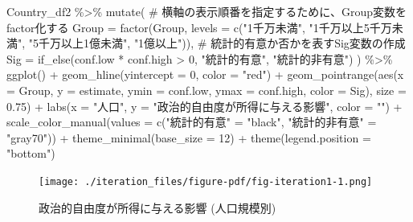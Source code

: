 \documentclass[
  a4paper,
  pandoc,
  ja=standard,
  jafont=haranoaji]{bxjsbook}
\newenvironment{Shaded}{\begin{snugshade}}{\end{snugshade}}
\newcommand{\AttributeTok}[1]{\textcolor[rgb]{0.00,0.48,0.65}{#1}}
\newcommand{\CommentTok}[1]{\textcolor[rgb]{0.37,0.37,0.37}{#1}}
\newcommand{\DecValTok}[1]{\textcolor[rgb]{0.68,0.00,0.00}{#1}}
\newcommand{\FloatTok}[1]{\textcolor[rgb]{0.68,0.00,0.00}{#1}}
\newcommand{\FunctionTok}[1]{\textcolor[rgb]{0.28,0.35,0.67}{#1}}
\newcommand{\NormalTok}[1]{\textcolor[rgb]{0.00,0.48,0.65}{#1}}
\newcommand{\OtherTok}[1]{\textcolor[rgb]{0.00,0.48,0.65}{#1}}
\newcommand{\SpecialCharTok}[1]{\textcolor[rgb]{0.37,0.37,0.37}{#1}}
\newcommand{\StringTok}[1]{\textcolor[rgb]{0.13,0.47,0.30}{#1}}
\begin{document}
\begin{Shaded}
\begin{Highlighting}[numbers=left,,]
\NormalTok{Country\_df2 }\SpecialCharTok{\%\textgreater{}\%}
  \FunctionTok{mutate}\NormalTok{(}
    \CommentTok{\# 横軸の表示順番を指定するために、Group変数をfactor化する}
    \AttributeTok{Group =} \FunctionTok{factor}\NormalTok{(Group, }\AttributeTok{levels =} \FunctionTok{c}\NormalTok{(}\StringTok{"1千万未満"}\NormalTok{, }\StringTok{"1千万以上5千万未満"}\NormalTok{,}
                                     \StringTok{"5千万以上1億未満"}\NormalTok{, }\StringTok{"1億以上"}\NormalTok{)),}
    \CommentTok{\# 統計的有意か否かを表すSig変数の作成}
    \AttributeTok{Sig   =} \FunctionTok{if\_else}\NormalTok{(conf.low }\SpecialCharTok{*}\NormalTok{ conf.high }\SpecialCharTok{\textgreater{}} \DecValTok{0}\NormalTok{, }\StringTok{"統計的有意"}\NormalTok{, }\StringTok{"統計的非有意"}\NormalTok{)}
\NormalTok{    ) }\SpecialCharTok{\%\textgreater{}\%}
  \FunctionTok{ggplot}\NormalTok{() }\SpecialCharTok{+} 
  \FunctionTok{geom\_hline}\NormalTok{(}\AttributeTok{yintercept =} \DecValTok{0}\NormalTok{, }\AttributeTok{color =} \StringTok{"red"}\NormalTok{) }\SpecialCharTok{+}
  \FunctionTok{geom\_pointrange}\NormalTok{(}\FunctionTok{aes}\NormalTok{(}\AttributeTok{x =}\NormalTok{ Group, }\AttributeTok{y =}\NormalTok{ estimate, }
                      \AttributeTok{ymin =}\NormalTok{ conf.low, }\AttributeTok{ymax =}\NormalTok{ conf.high, }\AttributeTok{color =}\NormalTok{ Sig), }
                  \AttributeTok{size =} \FloatTok{0.75}\NormalTok{) }\SpecialCharTok{+}
  \FunctionTok{labs}\NormalTok{(}\AttributeTok{x =} \StringTok{"人口"}\NormalTok{, }\AttributeTok{y =} \StringTok{"政治的自由度が所得に与える影響"}\NormalTok{, }\AttributeTok{color =} \StringTok{""}\NormalTok{) }\SpecialCharTok{+}
  \FunctionTok{scale\_color\_manual}\NormalTok{(}\AttributeTok{values =} \FunctionTok{c}\NormalTok{(}\StringTok{"統計的有意"} \OtherTok{=} \StringTok{"black"}\NormalTok{,}
                                \StringTok{"統計的非有意"} \OtherTok{=} \StringTok{"gray70"}\NormalTok{)) }\SpecialCharTok{+}
  \FunctionTok{theme\_minimal}\NormalTok{(}\AttributeTok{base\_size   =} \DecValTok{12}\NormalTok{) }\SpecialCharTok{+}
  \FunctionTok{theme}\NormalTok{(}\AttributeTok{legend.position =} \StringTok{"bottom"}\NormalTok{)}
\end{Highlighting}
\end{Shaded}

\begin{figure}[H]

{\centering \texttt{[image: ./iteration\_files/figure-pdf/fig-iteration1-1.png]}

}

\caption{\label{fig-iteration1}政治的自由度が所得に与える影響
(人口規模別)}

\end{figure}
\end{document}
